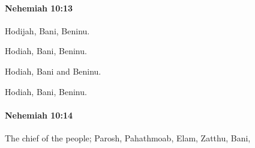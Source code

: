 		\paragraph{Nehemiah 10:13} %
			\label{NEHEMIAH-10-13}

			Hodijah, Bani, Beninu.

			\begin{versebox}
					\item[BHS] 
					\item[LXX] 
					\item[ASV] Hodiah, Bani, Beninu.
					\item[NIV] Hodiah, Bani and Beninu.
					\item[NRSV] Hodiah, Bani, Beninu.
			\end{versebox}

		\paragraph{Nehemiah 10:14} %
			\label{NEHEMIAH-10-14}

			The chief of the people; Parosh, Pahathmoab, Elam, Zatthu, Bani,

